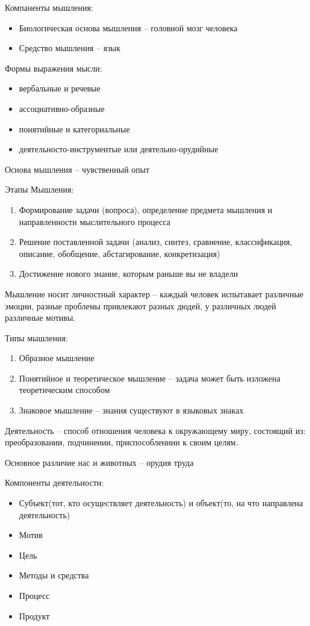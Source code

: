 \documentclass[12pt,a4paper]{book}
\begin{document}
Компаненты мышления:
\begin{itemize}
	\item Биологическая основа мышления -- головной мозг человека
	\item Средство мышления -- язык
\end{itemize}
Формы выражения мысли:
\begin{itemize}
	\item вербальные и речевые
	\item ассоциативно-образные
	\item понятийные и категориальные
	\item деятельносто-инструментые или деятельно-орудийные
\end{itemize}

Основа мышления -- чувственный опыт

Этапы Мышления:
\begin{enumerate}
	\item Формирование задачи (вопроса), определение предмета мышления и направленности мыслительного процесса
	\item Решение поставленной задачи (анализ, синтез, сравнение, классификация, описание, обобщение, абстагирование, конкретизация)
	\item Достижение нового знание, которым раньше вы не владели
\end{enumerate}

Мышление носит личностный характер -- каждый человек испытавает различные эмоции, разные проблемы привлекают разных дюдей, у различных людей различные мотивы.

Типы мышления:
\begin{enumerate}
	\item Образное мышление
	\item Понятийное и теоретическое мышление -- задача может быть изложена теоретическим способом
	\item Знаковое мышление -- знания существуют в языковых знаках
\end{enumerate}

Деятельность -- способ отношения человека к окружающему миру, состоящий из: преобразовании, подчинении, приспособлениии к своим целям.

Основное различие нас и животных -- орудия труда

Компоненты деятельности:
\begin{itemize}
	\item Субъект(тот, кто осуществляет деятельность) и объект(то, на что направлена деятельность)
	\item Мотив
	\item Цель
	\item Методы и средства
	\item Процесс
	\item Продукт
\end{itemize}
\end{document}
